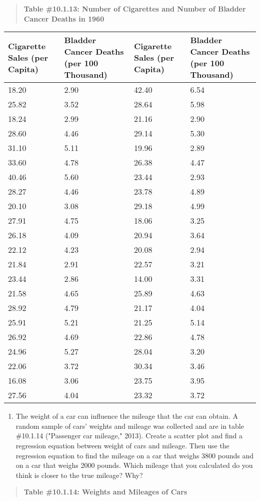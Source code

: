 \documentclass[]{book}
\providecommand{\tightlist}{%
  \setlength{\itemsep}{0pt}\setlength{\parskip}{0pt}}
\begin{document}
\begin{quote}
\textbf{Table \#10.1.13: Number of Cigarettes and Number of Bladder Cancer
Deaths in 1960}
\end{quote}

\begin{longtable}[]{@{}llll@{}}
\toprule
Cigarette Sales (per Capita) & Bladder Cancer Deaths (per 100 Thousand) & Cigarette Sales (per Capita) & Bladder Cancer Deaths (per 100 Thousand)\tabularnewline
\midrule
\endhead
18.20 & 2.90 & 42.40 & 6.54\tabularnewline
25.82 & 3.52 & 28.64 & 5.98\tabularnewline
18.24 & 2.99 & 21.16 & 2.90\tabularnewline
28.60 & 4.46 & 29.14 & 5.30\tabularnewline
31.10 & 5.11 & 19.96 & 2.89\tabularnewline
33.60 & 4.78 & 26.38 & 4.47\tabularnewline
40.46 & 5.60 & 23.44 & 2.93\tabularnewline
28.27 & 4.46 & 23.78 & 4.89\tabularnewline
20.10 & 3.08 & 29.18 & 4.99\tabularnewline
27.91 & 4.75 & 18.06 & 3.25\tabularnewline
26.18 & 4.09 & 20.94 & 3.64\tabularnewline
22.12 & 4.23 & 20.08 & 2.94\tabularnewline
21.84 & 2.91 & 22.57 & 3.21\tabularnewline
23.44 & 2.86 & 14.00 & 3.31\tabularnewline
21.58 & 4.65 & 25.89 & 4.63\tabularnewline
28.92 & 4.79 & 21.17 & 4.04\tabularnewline
25.91 & 5.21 & 21.25 & 5.14\tabularnewline
26.92 & 4.69 & 22.86 & 4.78\tabularnewline
24.96 & 5.27 & 28.04 & 3.20\tabularnewline
22.06 & 3.72 & 30.34 & 3.46\tabularnewline
16.08 & 3.06 & 23.75 & 3.95\tabularnewline
27.56 & 4.04 & 23.32 & 3.72\tabularnewline
\bottomrule
\end{longtable}

\begin{enumerate}
\def\labelenumi{\arabic{enumi}.}
\setcounter{enumi}{9}
\tightlist
\item
  The weight of a car can influence the mileage that the car can
  obtain. A random sample of cars' weights and mileage was collected
  and are in table \#10.1.14 ("Passenger car mileage," 2013). Create
  a scatter plot and find a regression equation between weight of cars
  and mileage. Then use the regression equation to find the mileage on
  a car that weighs 3800 pounds and on a car that weighs 2000 pounds.
  Which mileage that you calculated do you think is closer to the true
  mileage? Why?
\end{enumerate}

\begin{quote}
\textbf{Table \#10.1.14: Weights and Mileages of Cars}
\end{quote}
\end{document}
